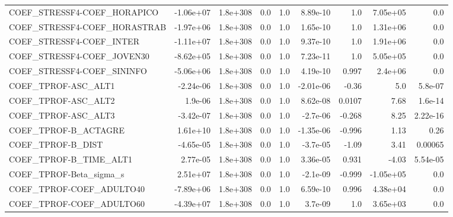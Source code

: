 \begin{tabular}{lrrrrrrrr}
COEF\_STRESSF4-COEF\_HORAPICO       &   -1.06e+07 &     1.8e+308 &     0.0 &      1.0 &   8.89e-10 &         1.0 &     7.05e+05 &           0.0 \\
COEF\_STRESSF4-COEF\_HORASTRAB      &   -1.97e+06 &     1.8e+308 &     0.0 &      1.0 &   1.65e-10 &         1.0 &     1.31e+06 &           0.0 \\
COEF\_STRESSF4-COEF\_INTER          &   -1.11e+07 &     1.8e+308 &     0.0 &      1.0 &   9.37e-10 &         1.0 &     1.91e+06 &           0.0 \\
COEF\_STRESSF4-COEF\_JOVEN30        &   -8.62e+05 &     1.8e+308 &     0.0 &      1.0 &   7.23e-11 &         1.0 &     5.05e+05 &           0.0 \\
COEF\_STRESSF4-COEF\_SININFO        &   -5.06e+06 &     1.8e+308 &     0.0 &      1.0 &   4.19e-10 &       0.997 &      2.4e+06 &           0.0 \\
COEF\_TPROF-ASC\_ALT1               &   -2.24e-06 &     1.8e+308 &     0.0 &      1.0 &  -2.01e-06 &       -0.36 &          5.0 &       5.8e-07 \\
COEF\_TPROF-ASC\_ALT2               &     1.9e-06 &     1.8e+308 &     0.0 &      1.0 &   8.62e-08 &      0.0107 &         7.68 &       1.6e-14 \\
COEF\_TPROF-ASC\_ALT3               &   -3.42e-07 &     1.8e+308 &     0.0 &      1.0 &   -2.7e-06 &      -0.268 &         8.25 &      2.22e-16 \\
COEF\_TPROF-B\_ACTAGRE              &    1.61e+10 &     1.8e+308 &     0.0 &      1.0 &  -1.35e-06 &      -0.996 &         1.13 &          0.26 \\
COEF\_TPROF-B\_DIST                 &   -4.65e-05 &     1.8e+308 &     0.0 &      1.0 &   -3.7e-05 &       -1.09 &         3.41 &       0.00065 \\
COEF\_TPROF-B\_TIME\_ALT1            &    2.77e-05 &     1.8e+308 &     0.0 &      1.0 &   3.36e-05 &       0.931 &        -4.03 &      5.54e-05 \\
COEF\_TPROF-Beta\_sigma\_s           &    2.51e+07 &     1.8e+308 &     0.0 &      1.0 &   -2.1e-09 &      -0.999 &    -1.05e+05 &           0.0 \\
COEF\_TPROF-COEF\_ADULTO40          &   -7.89e+06 &     1.8e+308 &     0.0 &      1.0 &   6.59e-10 &       0.996 &     4.38e+04 &           0.0 \\
COEF\_TPROF-COEF\_ADULTO60          &   -4.39e+07 &     1.8e+308 &     0.0 &      1.0 &    3.7e-09 &         1.0 &     3.65e+03 &           0.0 \\

\end{tabular}
